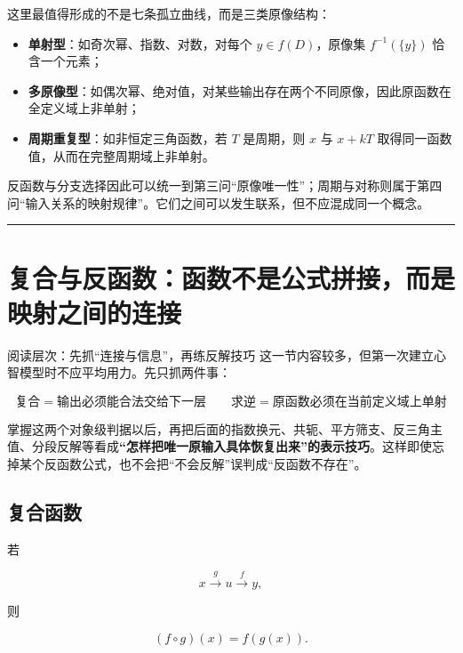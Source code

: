 \documentclass[11pt,a4paper]{ctexart}
\providecommand{\tightlist}{}
\begin{document}
这里最值得形成的不是七条孤立曲线，而是三类原像结构：

\begin{itemize}
\tightlist
\item
  \textbf{单射型}：如奇次幂、指数、对数，对每个 \(y\in f(D)\)，原像集 \(f^{-1}(\{y\})\) 恰含一个元素；
\item
  \textbf{多原像型}：如偶次幂、绝对值，对某些输出存在两个不同原像，因此原函数在全定义域上非单射；
\item
  \textbf{周期重复型}：如非恒定三角函数，若 \(T\) 是周期，则 \(x\) 与 \(x+kT\) 取得同一函数值，从而在完整周期域上非单射。
\end{itemize}

反函数与分支选择因此可以统一到第三问“原像唯一性”；周期与对称则属于第四问“输入关系的映射规律”。它们之间可以发生联系，但不应混成同一个概念。

\begin{center}\rule{0.5\linewidth}{0.5pt}\end{center}

\section{复合与反函数：函数不是公式拼接，而是映射之间的连接}\label{ux590dux5408ux4e0eux53cdux51fdux6570ux51fdux6570ux4e0dux662fux516cux5f0fux62fcux63a5ux800cux662fux6620ux5c04ux4e4bux95f4ux7684ux8fdeux63a5}

\begin{corebox}{阅读层次：先抓“连接与信息”，再练反解技巧}
这一节内容较多，但第一次建立心智模型时不应平均用力。先只抓两件事：

\[
\boxed{
\text{复合}=\text{输出必须能合法交给下一层}
\qquad
\text{求逆}=\text{原函数必须在当前定义域上单射}
}
\]

掌握这两个对象级判据以后，再把后面的指数换元、共轭、平方筛支、反三角主值、分段反解等看成\textbf{“怎样把唯一原输入具体恢复出来”的表示技巧}。这样即使忘掉某个反函数公式，也不会把“不会反解”误判成“反函数不存在”。
\end{corebox}

\subsection{复合函数}\label{ux590dux5408ux51fdux6570}

若

\[
x\xrightarrow{g}u\xrightarrow{f}y,
\]

则

\[
(f\circ g)(x)=f(g(x)).
\]
\end{document}
